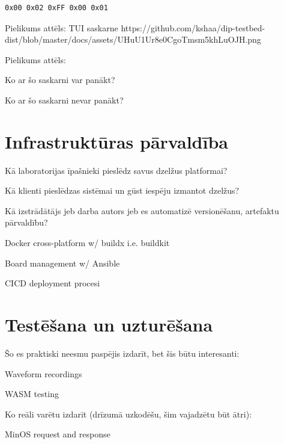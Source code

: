 \begin{lstlisting}[caption={MinOS LED gaismu pakete},label={lst:minosledchunk},captionpos=b]
    0x00 0x02 0xFF 0x00 0x01 
\end{lstlisting}

Pielikums attēls: TUI saskarne https://github.com/kshaa/dip-testbed-dist/blob/master/docs/assets/UHuU1Ur8e0CgoTmsm5khLuOJH.png

Pielikums attēls: 

Ko ar šo saskarni var panākt?

Ko ar šo saskarni nevar panākt?

\section{Infrastruktūras pārvaldība}
\label{sec:ops}

Kā laboratorijas īpašnieki pieslēdz savus dzelžus platformai?

Kā klienti pieslēdzas sistēmai un gūst iespēju izmantot dzelžus?

Kā izstrādātājs jeb darba autors jeb es automatizē versionēšanu, artefaktu pārvaldību?

Docker cross-platform w/ buildx i.e. buildkit

Board management w/ Ansible

CICD deployment procesi

\section{Testēšana un uzturēšana}
\label{sec:usage}

Šo es praktiski neesmu paspējis izdarīt, bet šis būtu interesanti:

Waveform recordings

WASM testing

Ko reāli varētu izdarīt (drīzumā uzkodēšu, šim vajadzētu būt ātri):

MinOS request and response
